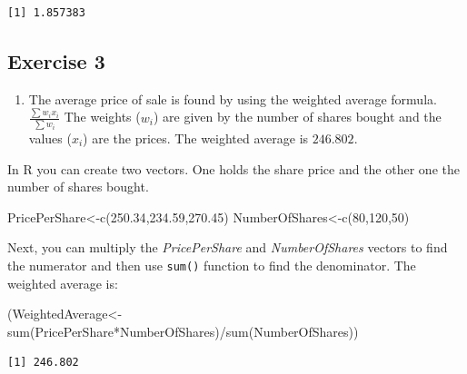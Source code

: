 \documentclass[
  letterpaper,
  DIV=11,
  numbers=noendperiod]{scrreprt}
\newenvironment{Shaded}{\begin{snugshade}}{\end{snugshade}}
\newcommand{\DecValTok}[1]{\textcolor[rgb]{0.68,0.00,0.00}{#1}}
\newcommand{\FloatTok}[1]{\textcolor[rgb]{0.68,0.00,0.00}{#1}}
\newcommand{\FunctionTok}[1]{\textcolor[rgb]{0.28,0.35,0.67}{#1}}
\newcommand{\NormalTok}[1]{\textcolor[rgb]{0.00,0.23,0.31}{#1}}
\newcommand{\OtherTok}[1]{\textcolor[rgb]{0.00,0.23,0.31}{#1}}
\newcommand{\SpecialCharTok}[1]{\textcolor[rgb]{0.37,0.37,0.37}{#1}}
\providecommand{\tightlist}{%
  \setlength{\itemsep}{0pt}\setlength{\parskip}{0pt}}\usepackage{longtable,booktabs,array}
\begin{document}
\begin{verbatim}
[1] 1.857383
\end{verbatim}

\hypertarget{exercise-3-5}{%
\subsection*{Exercise 3}\label{exercise-3-5}}

\begin{enumerate}
\def\labelenumi{\arabic{enumi}.}
\tightlist
\item
  The average price of sale is found by using the weighted average
  formula. \(\frac{\sum w_{i}x_{i}}{\sum w_{i}}\) The weights
  (\(w_{i}\)) are given by the number of shares bought and the values
  (\(x_{i}\)) are the prices. The weighted average is \(246.802\).
\end{enumerate}

In R you can create two vectors. One holds the share price and the other
one the number of shares bought.

\begin{Shaded}
\begin{Highlighting}[numbers=left,,]
\NormalTok{PricePerShare}\OtherTok{\textless{}{-}}\FunctionTok{c}\NormalTok{(}\FloatTok{250.34}\NormalTok{,}\FloatTok{234.59}\NormalTok{,}\FloatTok{270.45}\NormalTok{)}
\NormalTok{NumberOfShares}\OtherTok{\textless{}{-}}\FunctionTok{c}\NormalTok{(}\DecValTok{80}\NormalTok{,}\DecValTok{120}\NormalTok{,}\DecValTok{50}\NormalTok{)}
\end{Highlighting}
\end{Shaded}

Next, you can multiply the \emph{PricePerShare} and
\emph{NumberOfShares} vectors to find the numerator and then use
\texttt{sum()} function to find the denominator. The weighted average
is:

\begin{Shaded}
\begin{Highlighting}[numbers=left,,]
\NormalTok{(WeightedAverage}\OtherTok{\textless{}{-}}
  \FunctionTok{sum}\NormalTok{(PricePerShare}\SpecialCharTok{*}\NormalTok{NumberOfShares)}\SpecialCharTok{/}\FunctionTok{sum}\NormalTok{(NumberOfShares))}
\end{Highlighting}
\end{Shaded}

\begin{verbatim}
[1] 246.802
\end{verbatim}
\end{document}
